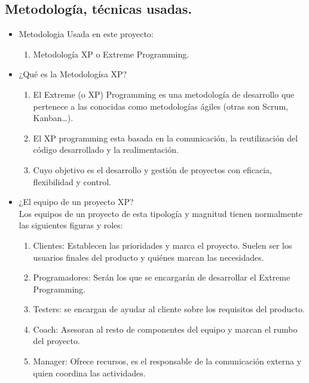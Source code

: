 \documentclass[preprint,12pt]{elsarticle}
\begin{document}
	\subsection{Metodología, técnicas usadas.}
\begin{itemize}
		\item Metodologia Usada en este proyecto:
\begin{enumerate}
	\item Metodología XP o Extreme Programming.
\end{enumerate}
		\item ¿Qué es la Metodologísa XP?
			\begin{enumerate}
				\item El Extreme (o XP) Programming es una metodología de desarrollo que pertenece a las conocidas como metodologías ágiles (otras son Scrum, Kanban…).
				\item El XP programming esta basada en la comunicación, la reutilización del código desarrollado y la realimentación.
				\item Cuyo objetivo es el desarrollo y gestión de proyectos con eficacia, flexibilidad y control.
			\end{enumerate}			
		\item ¿El equipo de un proyecto XP?\\
			Los equipos de un proyecto de esta tipología y magnitud tienen normalmente las siguientes figuras y roles:
				\begin{enumerate}
					\item Clientes: Establecen las prioridades y marca el proyecto. Suelen ser los usuarios finales del producto y quiénes marcan las necesidades.
					\item Programadores: Serán los que se encargarán de desarrollar el Extreme Programming.
					\item Testers: se encargan de ayudar al cliente sobre los requisitos del producto.
					\item Coach: Asesoran al resto de componentes del equipo y marcan el rumbo del proyecto.
					\item Manager: Ofrece recursos, es el responsable de la comunicación externa y quien coordina las actividades.
				\end{enumerate}
\end{itemize}
			
\end{document}
